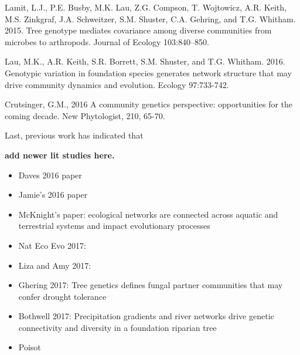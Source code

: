 \documentclass[fleqn,10pt]{wlscirep}
\begin{document}
Lamit, L.J., P.E. Busby, M.K. Lau, Z.G. Compson, T. Wojtowicz,
A.R. Keith, M.S. Zinkgraf, J.A. Schweitzer, S.M. Shuster,
C.A. Gehring, and T.G. Whitham.  2015.  Tree genotype mediates
covariance among diverse communities from microbes to arthropods.
Journal of Ecology 103:840–850.

Lau, M.K., A.R. Keith, S.R. Borrett, S.M. Shuster, and T.G. Whitham.
2016.  Genotypic variation in foundation species generates network
structure that may drive community dynamics and evolution.  Ecology
97:733-742.

Crutsinger, G.M., 2016 A community genetics perspective: opportunities
for the coming decade. New Phytologist, 210, 65-70.




Last, previous work has indicated that 

\textbf{add newer lit studies here.}
\begin{itemize}
\item Daves 2016 paper
\item Jamie's 2016 paper
\item McKnight's paper: ecological networks are connected across
  aquatic and terrestrial systems and impact evolutionary processes
\item Nat Eco Evo 2017:
\item Liza and Amy 2017: 
\item Ghering 2017: Tree genetics defines fungal partner communities
  that may confer drought tolerance
\item Bothwell 2017: Precipitation gradients and river networks drive
  genetic connectivity and diversity in a foundation riparian tree
\item Poisot
\end{itemize}
\end{document}
